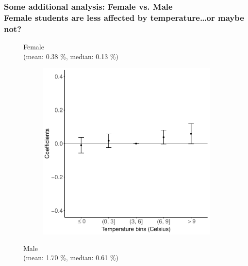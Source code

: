 \documentclass[10pt, pdfmx,hiresbb]{beamer}
\begin{document}
\begin{frame}\frametitle{Some additional analysis: Female vs. Male \\ {\small Female students are less affected by temperature\dots or maybe not?}}
  \begin{figure}
    \center
    \begin{minipage}{0.43\textwidth}
      \begin{center}
        Female \\
        {\small (mean: 0.38 \%, median: 0.13 \%)}
      \end{center}
      \begin{figure}[h]
        \centering
        \includegraphics[width = \textwidth]{../Output/images/reg_gender_2.pdf}
      \end{figure}
    \end{minipage}
    \begin{minipage}{0.43\textwidth}
      \begin{center}
        Male \\
        {\small (mean: 1.70 \%, median: 0.61 \%)}
      \end{center}
      \begin{figure}[h]

\end{figure}
\end{minipage}
\end{figure}
\end{frame}
\end{document}
